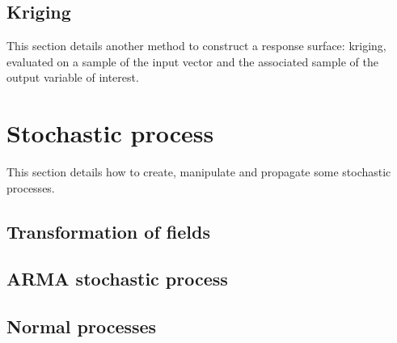 \newpage \subsection{Kriging}

This section details another method to construct a response surface: kriging, evaluated on a sample of the input vector and the associated sample of the output variable of interest. \\




\newpage \section{Stochastic process}


This section details how to create, manipulate and propagate some stochastic processes. \\


\newpage 
\newpage 
\newpage 
\newpage 
\newpage 
\newpage 

\newpage \subsection{Transformation of fields}


\newpage 

\newpage \subsection{ARMA stochastic process}



\newpage 
\newpage 
\newpage 
\newpage 

\newpage \subsection{Normal processes}

